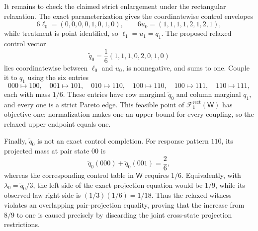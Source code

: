 It remains to check the claimed strict enlargement under the rectangular relaxation.  The exact parameterization gives the coordinatewise control envelopes
\[
6\ell_0=(0,0,0,0,1,0,1,0),
\qquad
6u_0=(1,1,1,1,2,1,2,1),
\]
while treatment is point identified, so \(\ell_1=u_1=q_1\).  The proposed relaxed control vector
\[
\widetilde q_0=\frac16(1,1,1,0,2,0,1,0)
\]
lies coordinatewise between \(\ell_0\) and \(u_0\), is nonnegative, and sums to one.  Couple it to \(q_1\) using the six entries
\[
000\mapsto100,
\quad001\mapsto101,
\quad010\mapsto110,
\quad100\mapsto110,
\quad100\mapsto111,
\quad110\mapsto111,
\]
each with mass \(1/6\).  These entries have row marginal \(\widetilde q_0\) and column marginal \(q_1\), and every one is a strict Pareto edge.  This feasible point of \(\mathcal F^{\mathrm{rect}}_1(\mathsf W)\) has objective one; normalization makes one an upper bound for every coupling, so the relaxed upper endpoint equals one.

Finally, \(\widetilde q_0\) is not an exact control completion.  For response pattern \(110\), its projected mass at pair state \(00\) is
\[
\widetilde q_0(000)+\widetilde q_0(001)=\frac{2}{6},
\]
whereas the corresponding control table in \(\mathsf W\) requires \(1/6\).  Equivalently, with \(\lambda_0=\widetilde q_0/3\), the left side of the exact projection equation would be \(1/9\), while its observed-law right side is \((1/3)(1/6)=1/18\).  Thus the relaxed witness violates an overlapping pair-projection equality, proving that the increase from \(8/9\) to one is caused precisely by discarding the joint cross-state projection restrictions.
